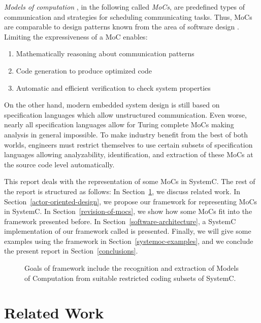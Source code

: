 \emph{Models of computation}
\cite{embsft:2002}, in the following called \emph{MoCs}, are
predefined types of communication and strategies for scheduling
communicating tasks. Thus, MoCs are comparable to design
patterns known from the area of software design \cite{gamma:1995}.
Limiting the expressiveness of a MoC enables:

\begin{enumerate}
\item Mathematically reasoning about communication patterns

\item Code generation to produce optimized code

\item Automatic and efficient verification to check system properties
\end{enumerate}

On the other hand, modern embedded system design is still based on
specification languages which allow unstructured communication.
Even worse, nearly all specification languages allow for Turing
complete MoCs making analysis in general impossible.
To make industry benefit from the best of both worlds,
engineers must restrict themselves to use certain subsets of
specification languages allowing analyzability, identification,
and extraction of these MoCs at the source code level automatically.

This report deals with the representation of some %
MoCs in SystemC. The rest of the report is structured as follows:
In Section~\ref{related-work}, we discuss related work. In
Section~\ref{actor-oriented-design}, we propose our framework for
representing MoCs in SystemC. In Section~\ref{revision-of-mocs},
we show how some MoCs fit into
the framework presented before. In Section~\ref{software-architecture},
a SystemC implementation of our framework called \SysteMoC{} is
presented. Finally, we will give some examples using the \SysteMoC{}
framework in Section~\ref{systemoc-examples}, and we conclude
the present report in Section~\ref{conclusions}.

\begin{figure}
\centering

\caption{\label{fig:SysteMoC-Goals}Goals of \SysteMoC{} framework
  include the recognition and extraction of Models of Computation
  from suitable restricted coding subsets of SystemC.}
\end{figure}

\section{Related Work}\label{related-work}

